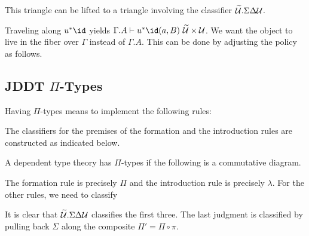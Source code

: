 \documentclass{amsart}
\begin{document}
This triangle can be lifted to a triangle involving the classifier $\widetilde{\mathcal{U}}.\Sigma\Delta\mathcal{U}$.


Traveling along $u^{*}\id$ yields $\Gamma.A \vdash u^{*}\id(a,B)~\Tm \times \Ty$.
We want the object to live in the fiber over $\Gamma$ instead of $\Gamma.A$.
This can be done by adjusting the policy as follows.


\subsection{JDDT $\Pi$-Types}
\label{sec:jddt-pi-types}

Having $\Pi$-types means to implement the following rules:

The classifiers for the premises of the formation and the introduction rules are constructed as indicated below.


A dependent type theory has $\Pi$-types if the following is a commutative diagram.


The formation rule is precisely $\Pi$ and the introduction rule is precisely $\lambda$.
For the other rules, we need to classify
It is clear that $\widetilde{\mathcal{U}}.\Sigma\Delta\mathcal{U}$ classifies the first three.
The last judgment is classified by pulling back $\Sigma$ along the composite $\Pi' = \Pi \circ \pi$.





\end{document}
